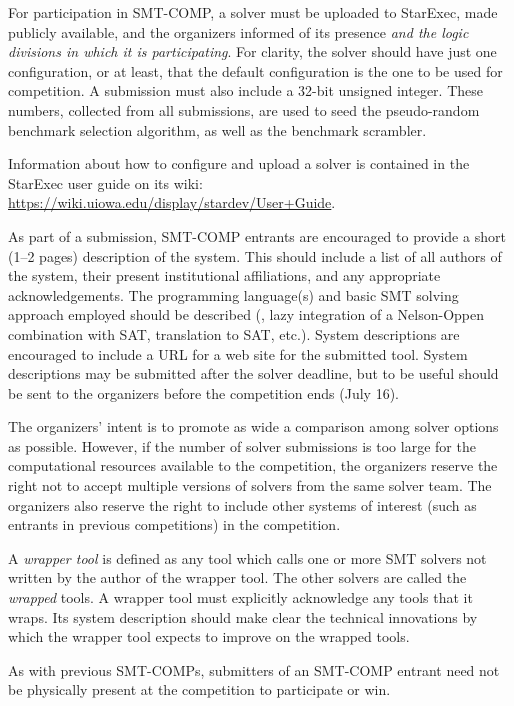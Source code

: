 \documentclass[12pt]{article}
\begin{document}
For participation in SMT-COMP, a solver must be
uploaded to StarExec, made publicly available, and the organizers informed of its presence {\em and the logic divisions in which it is participating}. For clarity, the solver should have just one configuration, or at least, that the default configuration is the one to be used for competition.
A submission must also include a 32-bit unsigned
integer.  These numbers, collected from all submissions, are used
to seed the pseudo-random benchmark selection algorithm, as well
as the benchmark scrambler.

Information about how to configure and upload a solver is contained in the StarExec user guide on its wiki:
\url{https://wiki.uiowa.edu/display/stardev/User+Guide}.

As part of a submission,
SMT-COMP entrants are encouraged to provide a short (1--2 pages) description of
the system.  This should include a list of all authors of the system,
 their present institutional affiliations, and any appropriate acknowledgements.  The programming
language(s) and basic SMT solving approach employed should be
described (\eg, lazy integration of a Nelson-Oppen combination with
SAT, translation to SAT, etc.).  System descriptions are encouraged to
include a URL for a web site for the submitted tool.  System descriptions may be submitted after the solver deadline, but to be useful should be sent to the organizers before the competition ends (July 16).

The organizers' intent is to promote as wide a comparison among solver options as possible.
However, if the number of solver submissions is too large for the
computational resources available to the competition, the organizers reserve the right not to
accept multiple versions of solvers from the same solver team.  The organizers also reserve the right to
include other systems of interest (such as entrants in previous competitions) in the
competition.

A \emph{wrapper tool} is defined as any tool
which calls one or more SMT solvers not written by the author of the wrapper
tool.  The other solvers are called the \emph{wrapped} tools.  
A wrapper tool must explicitly acknowledge any tools that it wraps.
Its system description should make clear the technical innovations by which the
wrapper tool expects to improve on the wrapped tools.

As with previous SMT-COMPs, submitters of an SMT-COMP entrant need not 
be physically present at the competition to
participate or win.
\end{document}
